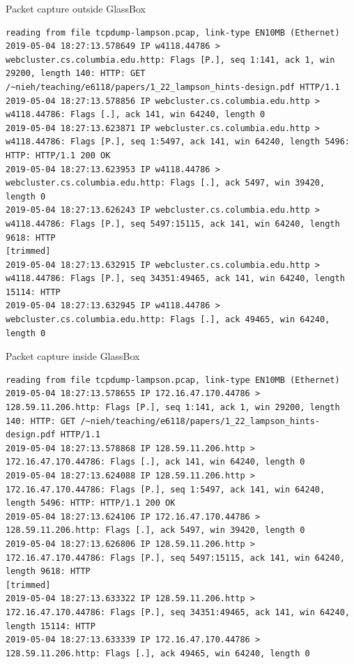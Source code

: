\documentclass{proc}
\begin{document}
\begin{minipage}[t]{\textwidth}
Packet capture outside GlassBox
\begin{lstlisting}
reading from file tcpdump-lampson.pcap, link-type EN10MB (Ethernet)
2019-05-04 18:27:13.578649 IP w4118.44786 > webcluster.cs.columbia.edu.http: Flags [P.], seq 1:141, ack 1, win 29200, length 140: HTTP: GET /~nieh/teaching/e6118/papers/1_22_lampson_hints-design.pdf HTTP/1.1
2019-05-04 18:27:13.578856 IP webcluster.cs.columbia.edu.http > w4118.44786: Flags [.], ack 141, win 64240, length 0
2019-05-04 18:27:13.623871 IP webcluster.cs.columbia.edu.http > w4118.44786: Flags [P.], seq 1:5497, ack 141, win 64240, length 5496: HTTP: HTTP/1.1 200 OK
2019-05-04 18:27:13.623953 IP w4118.44786 > webcluster.cs.columbia.edu.http: Flags [.], ack 5497, win 39420, length 0
2019-05-04 18:27:13.626243 IP webcluster.cs.columbia.edu.http > w4118.44786: Flags [P.], seq 5497:15115, ack 141, win 64240, length 9618: HTTP
[trimmed]
2019-05-04 18:27:13.632915 IP webcluster.cs.columbia.edu.http > w4118.44786: Flags [P.], seq 34351:49465, ack 141, win 64240, length 15114: HTTP
2019-05-04 18:27:13.632945 IP w4118.44786 > webcluster.cs.columbia.edu.http: Flags [.], ack 49465, win 64240, length 0
\end{lstlisting}
Packet capture inside GlassBox
\begin{lstlisting}
reading from file tcpdump-lampson.pcap, link-type EN10MB (Ethernet)
2019-05-04 18:27:13.578655 IP 172.16.47.170.44786 > 128.59.11.206.http: Flags [P.], seq 1:141, ack 1, win 29200, length 140: HTTP: GET /~nieh/teaching/e6118/papers/1_22_lampson_hints-design.pdf HTTP/1.1
2019-05-04 18:27:13.578868 IP 128.59.11.206.http > 172.16.47.170.44786: Flags [.], ack 141, win 64240, length 0
2019-05-04 18:27:13.624088 IP 128.59.11.206.http > 172.16.47.170.44786: Flags [P.], seq 1:5497, ack 141, win 64240, length 5496: HTTP: HTTP/1.1 200 OK
2019-05-04 18:27:13.624106 IP 172.16.47.170.44786 > 128.59.11.206.http: Flags [.], ack 5497, win 39420, length 0
2019-05-04 18:27:13.626806 IP 128.59.11.206.http > 172.16.47.170.44786: Flags [P.], seq 5497:15115, ack 141, win 64240, length 9618: HTTP
[trimmed]
2019-05-04 18:27:13.633322 IP 128.59.11.206.http > 172.16.47.170.44786: Flags [P.], seq 34351:49465, ack 141, win 64240, length 15114: HTTP
2019-05-04 18:27:13.633339 IP 172.16.47.170.44786 > 128.59.11.206.http: Flags [.], ack 49465, win 64240, length 0
\end{lstlisting}
\end{minipage}
\end{document}
